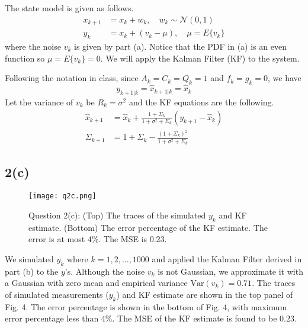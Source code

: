 \documentclass[a4paper, 11pt]{article}
\begin{document}
The state model is given as follows. 
\begin{equation}
\begin{split}
x_{k+1} & = x_k + w_k, \quad w_k\sim\mathcal{N}(0,1)\\
y_k & = x_k + \left(v_k - \mu \right), \quad \mu = E\{v_k\}
\end{split}
\end{equation}
where the noise $v_k$ is given by part (a). Notice that the PDF in (a) is an even function so $\mu =  E\{v_k\} = 0$. We will apply the Kalman Filter (KF) to the system. 

Following the notation in class, since $A_k = C_k = Q_k = 1$ and $f_k = g_k = 0$, we have 
\begin{equation}
y_{k+1|k} = \hat{x}_{k+1|k} = \hat{x}_k
\end{equation}
Let the variance of $v_k$ be $R_{k}=\sigma^2$ and the KF equations are the following. 
\begin{equation}
\begin{split}
\hat{x}_{k+1} & = \hat{x}_k + \frac{1 + \Sigma_k}{1 + \sigma^2 + \Sigma_k}\left( y_{k+1} - \hat{x}_k \right) \\
\Sigma_{k+1} & = 1 + \Sigma_k - \frac{(1 + \Sigma_k)^2}{1 + \sigma^2 + \Sigma_k}
\end{split}
\end{equation}


\subsection*{2(c)}

\begin{figure}
	\begin{center}
		\texttt{[image: q2c.png]}
		\caption{Question 2(c): (Top) The traces of the simulated $y_k$ and KF estimate. (Bottom) The error percentage of the KF estimate. The error is at most $4\%$. The MSE is 0.23. }
	\end{center}
\end{figure}

We simulated $y_k$ where $k=1,2,\dots,1000$ and applied the Kalman Filter derived in part (b) to the $y$'s. Although the noise $v_k$ is not Gaussian, we approximate it with a Gaussian with zero mean and empirical variance $\text{Var}(v_k) = 0.71$. The traces of simulated measurements ($y_k$) and KF estimate are shown in the top panel of Fig. 4. The error percentage is shown in the bottom of Fig. 4, with maximum error percentage less than $4\%$. The MSE of the KF estimate is found to be $0.23$. 
\end{document}
